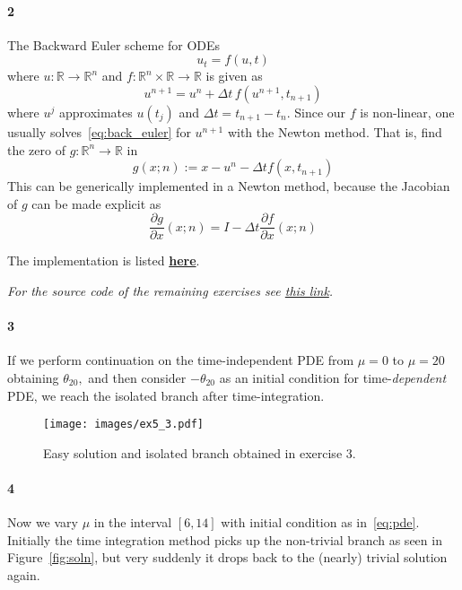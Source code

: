 \documentclass[a4paper]{article}
\begin{document}
  \paragraph{2} The Backward Euler scheme for ODEs
  \begin{equation}
    u_t = f(u, t)
  \end{equation}
  where $u: \mathbb{R} \to \mathbb{R}^n$ and $f: \mathbb{R}^n \times \mathbb{R} \to \mathbb{R}$ is given as
  \begin{equation}\label{eq:back_euler}
    u^{n+1} = u^{n} + \Delta t \, f(u^{n+1}, t_{n+1})
  \end{equation}
  where $u^j$ approximates $u(t_j)$ and $\Delta t = t_{n+1} - t_n.$ Since our $f$ is non-linear, one usually solves~\eqref{eq:back_euler} for $u^{n+1}$ with the Newton method. That is, find the zero of $g: \mathbb{R}^n \to \mathbb{R}$ in
  \begin{equation}
    g(x; n) := x - u^n - \Delta t f(x, t_{n + 1})
  \end{equation}
  This can be generically implemented in a Newton method, because the Jacobian of $g$ can be made explicit as
  \begin{equation}
    \frac{\partial g}{\partial x}(x; n) = I - \Delta t \frac{\partial f}{\partial x}(x; n)
  \end{equation}

  \noindent The implementation is listed {\bf\href{https://github.com/haampie/nbalss/blob/master/homework_5/src/nonlinear_backward_euler.jl}{here}}.

  \emph{For the source code of the remaining exercises see \href{https://github.com/haampie/nbalss/blob/master/homework_5/src/_exercises.jl}{this link}.}

  \paragraph{3} If we perform continuation on the time-independent PDE from $\mu = 0$ to $\mu = 20$ obtaining $\theta_{20},$ and then consider $-\theta_{20}$ as an initial condition for time-\emph{dependent} PDE, we reach the isolated branch after time-integration.

  \begin{figure}[h]
    \centerline{\texttt{[image: images/ex5\_3.pdf]}}
    \caption{Easy solution and isolated branch obtained in exercise 3.}
  \end{figure}

  \paragraph{4} Now we vary $\mu$ in the interval $[6, 14]$ with initial condition as in~\eqref{eq:pde}. Initially the time integration method picks up the non-trivial branch as seen in Figure~\ref{fig:soln}, but very suddenly it drops back to the (nearly) trivial solution again.
\end{document}
